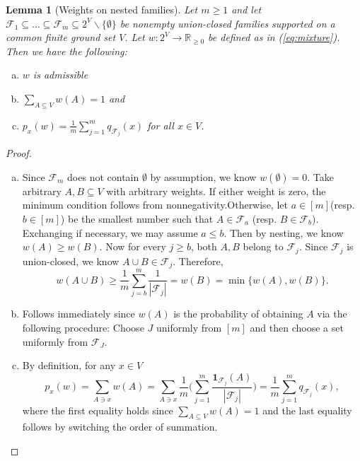 \documentclass[11pt]{article}
\newtheorem{lemma}[lemma]{Lemma}
\newcommand{\rr}{\mathbb{R}}
\newcommand{\<}{\langle}
\renewcommand{\>}{\rangle}
\newcommand{\calF}{\mathcal{F}}
\numberwithin{equation}{section}
\begin{document}
\begin{lemma}[Weights on nested families]\label{lem:reduce_to_nested}
    Let $m \geq 1$ and let $\calF_1 \subseteq ... \subseteq \calF_m \subseteq 2^V \backslash \{\emptyset\}$ be nonempty union-closed families supported on a common finite ground set $V$.  Let $w:2^V \to \rr_{\geq 0}$ be defined as in (\ref{eq:mixture}). Then we have the following:
    \begin{enumerate}[(a)]
        \item $w$ is admissible
        \item $\sum_{A \subseteq V}w(A) = 1$ and
        \item $p_x (w) = \frac{1}{m} \sum_{j=1}^mq_{\calF_j}(x)$ for all $x \in V$.
    \end{enumerate}
\end{lemma}
\begin{proof}
    \begin{enumerate}[(a)]
        \item Since $\calF_m$ does not contain $\emptyset$ by assumption, we know $w(\emptyset) = 0$. Take arbitrary $A, B \subseteq V$ with arbitrary weights. If either weight is zero, the minimum condition follows from nonnegativity.Otherwise, let $a \in [m]$(resp. $b \in [m]$) be the smallest number such that $A \in \calF_a$ (resp. $B \in \calF_b$). Exchanging if necessary, we may assume $a \leq b$. Then by nesting, we know $w(A) \geq w(B)$. Now for every $j \geq b$, both $A, B$ belong to $\calF_j$. Since $\calF_j$ is union-closed, we know $A \cup B \in \calF_j$. Therefore, 
        \[
        w(A \cup B) \geq \frac{1}{m}\sum_{j=b}^m \frac{1}{|\calF_j|} = w(B) = \min \{w(A), w(B)\}.
        \]
        \item Follows immediately since $w(A)$ is the probability of obtaining $A$ via the following procedure: Choose $J$ uniformly from $[m]$ and then choose a set uniformly from $\calF_J$.
        \item By definition, for any $x \in V$
        \[
        p_x(w) =  \sum_{A \ni x}w(A) = \sum_{A \ni x} \frac{1}{m}\Big(\sum_{j=1}^m \frac{\mathbf{1}_{\calF_j}(A)}{|\calF_j|}\Big) = \frac{1}{m} \sum_{j=1}^m q_{\calF_j}(x),
        \]
        where the first equality holds since $\sum_{A \subseteq V}w(A) = 1$ and the last equality follows by switching the order of summation.
    \end{enumerate}
\end{proof}
\end{document}
